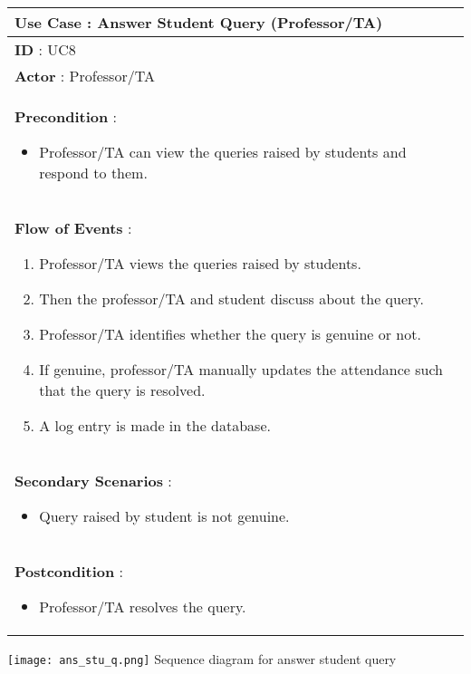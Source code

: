 \documentclass[paper=a4, fontsize=15pt]{scrartcl}
\begin{document}
\begin{tabular}{|p{36em}|} 
 \hline
 \textbf{Use Case :  Answer Student Query (Professor/TA)}\\
 \hline
 \textbf{ID } : UC8\\
 \hline
 \textbf{Actor }: Professor/TA\\
 \hline
 \textbf{Precondition }:
 \begin{itemize}[topsep=0pt]
     \item Professor/TA can view the queries raised by students and respond to them.    
 \end{itemize}\\
 \hline
 \textbf{Flow of Events }:
 \begin{enumerate}[topsep=0pt]
     \item Professor/TA views the queries raised by students.
     \item Then the professor/TA and student discuss about the query.     
     \item Professor/TA identifies whether the query is genuine or not.
     \item If genuine, professor/TA manually updates the attendance such that the query is resolved.
     \item A log entry is made in the database.
 \end{enumerate}\\
 \hline
 \textbf{Secondary Scenarios }:
\begin{itemize}[topsep=0pt]
    \item Query raised by student is not genuine.
\end{itemize}\\
 \hline 
 \textbf{Postcondition }:
 \begin{itemize}[topsep=0pt]
     \item Professor/TA resolves the query.    
 \end{itemize}\\
 \hline
 
 
 \end{tabular}
 
  \begin{center}
\texttt{[image: ans\_stu\_q.png]}
 {\Large Sequence diagram for answer student query}
\end{center}
\end{document}
